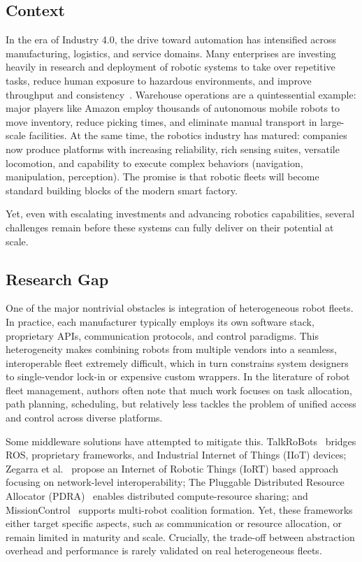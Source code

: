 \documentclass[conference]{IEEEtran}
\begin{document}
\subsection{Context}
In the era of Industry 4.0, 
 the drive toward automation has intensified across manufacturing, 
 logistics, and service domains. 
% 
Many enterprises are investing heavily in research and deployment of robotic systems 
to take over repetitive tasks, reduce human exposure to hazardous environments, 
 and improve throughput and consistency~\cite{DBLP:journals/sensors/TubisR23}. 
% 
Warehouse operations are a quintessential example: 
 major players like Amazon employ thousands of autonomous mobile robots to move inventory, 
 reduce picking times, and eliminate manual transport in large-scale facilities.
%
At the same time, the robotics industry has matured: 
 companies now produce platforms with increasing reliability, rich sensing suites, versatile locomotion, 
 and capability to execute complex behaviors (navigation, manipulation, perception). 
% 
The promise is that robotic fleets will become standard building blocks of the modern smart factory.

Yet, even with escalating investments and advancing robotics capabilities, 
 several challenges remain before these systems can fully deliver on their potential at scale.

\subsection{Research Gap}

One of the major nontrivial obstacles is integration of heterogeneous robot fleets. 
%
In practice, 
 each manufacturer typically employs its own software stack, proprietary APIs, 
 communication protocols, and control paradigms. 
% 
This heterogeneity makes combining robots from multiple vendors into a seamless, 
 interoperable fleet extremely difficult, which in turn constrains system designers 
 to single-vendor lock-in or expensive custom wrappers. 
% 
In the literature of robot fleet management, 
 authors often note that much work focuses on task allocation, path planning, scheduling, 
 but relatively less tackles the problem of unified access and control across diverse platforms. 

Some middleware solutions have attempted to mitigate this. 
%
TalkRoBots~\cite{ayaida2022fi} bridges ROS, proprietary frameworks, and  Industrial Internet of Things (IIoT) devices; 
 Zegarra et al.~\cite{cuadroszegarra2024jsan} propose an Internet of Robotic Things (IoRT) based approach focusing on network-level interoperability; 
 The Pluggable Distributed Resource Allocator (PDRA)~\cite{rossi2020iros} enables distributed compute-resource sharing; 
 and MissionControl~\cite{rodrigues2022jss} supports multi-robot coalition formation. 
% 
Yet,
 these frameworks either target specific aspects, 
 such as communication or resource allocation,
 or remain limited in maturity and scale. 
% 
Crucially, the trade-off between abstraction overhead 
 and performance is rarely validated on real heterogeneous fleets.
\end{document}
